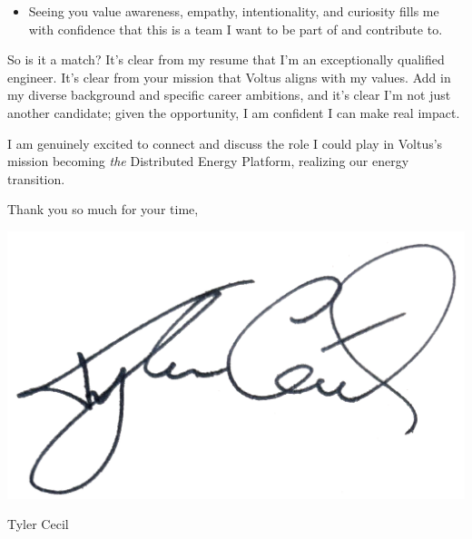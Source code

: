 \documentclass{tc_cv}
\begin{document}
\begin{adjustwidth}{40pt}{40pt}
\begin{itemize}
    \item Seeing you value awareness, empathy, intentionality, and curiosity
      fills me with confidence that this is a team I want to be part of and
      contribute to.

  \end{itemize} \medskip

  So is it a match? It's clear from my resume that I'm an exceptionally
  qualified engineer. It's clear from your mission that Voltus aligns with my
  values. Add in my diverse background and specific career ambitions, and it's
  clear I'm not just another candidate; given the opportunity, I am confident I
  can make real impact. \medskip

  I am genuinely excited to connect and
  discuss the role I could play in Voltus's mission becoming \emph{the}
  Distributed Energy Platform, realizing our energy transition.

  \begin{minipage}{0.5\linewidth}
    Thank you so much for your time,
    \vspace{1em}
  \end{minipage}
  \begin{minipage}{0.5\linewidth}
    \hfill\includegraphics[height=4.5\baselineskip]{sig}

    \vspace{-2em}
    \hfill Tyler Cecil
  \end{minipage}

\end{adjustwidth}
\end{document}
